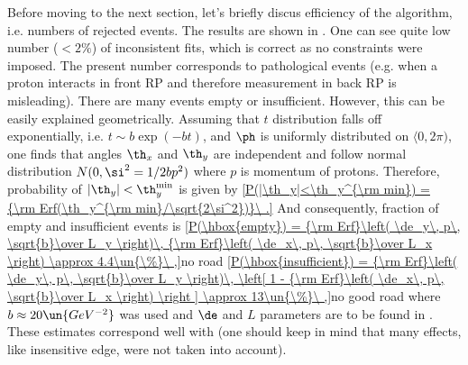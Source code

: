 \kern-8mm
\kern-8mm
\kern-8mm

Before moving to the next section, let's briefly discus efficiency of the algorithm, i.e. numbers of rejected events. The results are shown in . One can see quite low number ($< 2\%$) of inconsistent fits, which is correct as no constraints were imposed. The present number corresponds to pathological events (e.g. when a proton interacts in front RP and therefore measurement in back RP is misleading). There are many events empty or insufficient. However, this can be easily explained geometrically. Assuming that $t$ distribution falls off exponentially, i.e. $t\sim b\exp(-bt)$, and $\ph$ is uniformly distributed on $\langle 0, 2\pi)$, one finds that angles $\th_x$ and $\th_y$ are independent and follow normal distribution $N(0, \si^2 = 1/2bp^2)$ where $p$ is momentum of protons. Therefore, probability of $|\th_y|<\th_y^{\rm min}$ is given by
\eqref{P(|\th_y|<\th_y^{\rm min}) = {\rm Erf(\th_y^{\rm min}/\sqrt{2\si^2})}\ .}{}
And consequently, fraction of empty and insufficient events is
\eqref{P(\hbox{empty}) = {\rm Erf}\left( \de_y\, p\, \sqrt{b}\over L_y \right)\, {\rm Erf}\left( \de_x\, p\, \sqrt{b}\over L_x \right) \approx 4.4\un{\%}\ ,}{no road}
\eqref{P(\hbox{insufficient}) = {\rm Erf}\left( \de_y\, p\, \sqrt{b}\over L_y \right)\, \left[ 1 - {\rm Erf}\left( \de_x\, p\, \sqrt{b}\over L_x \right) \right ] \approx 13\un{\%}\ ,}{no good road}
where $b \approx 20\un{GeV^{-2}}$ was used and $\de$ and $L$ parameters are to be found in . These estimates correspond well with  (one should keep in mind that many effects, like insensitive edge, were not taken into account).



